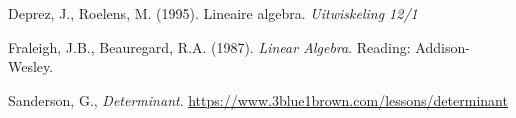 \stopcontents[inhoudloep]		%


\begin{bronnen}
	\item Deprez, J., Roelens, M. (1995). Lineaire algebra. \emph{Uitwiskeling 12/1}
\item Fraleigh, J.B., Beauregard, R.A. (1987). \emph{Linear Algebra}. Reading: Addison-Wesley.
\item Sanderson, G., \emph{Determinant}. \url{https://www.3blue1brown.com/lessons/determinant}
	
\end{bronnen}





